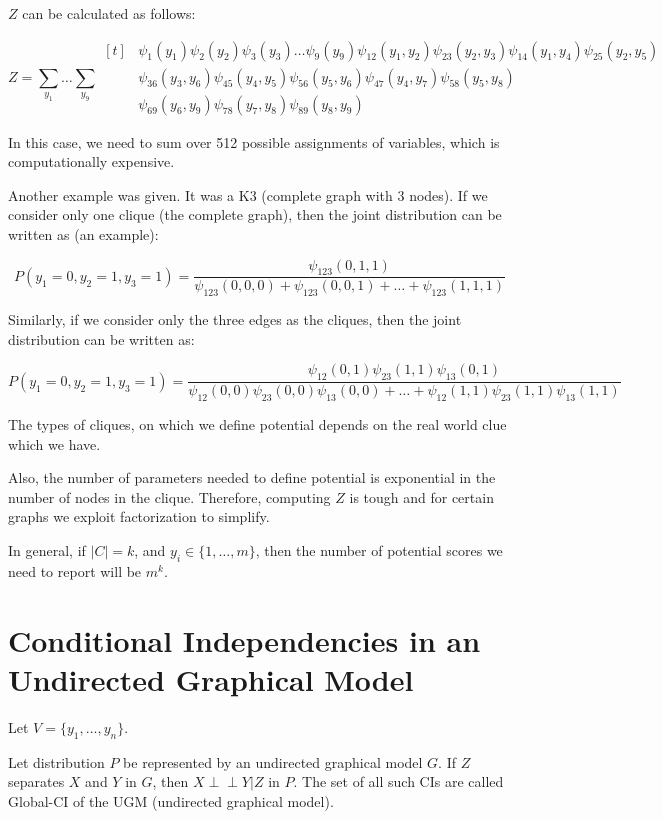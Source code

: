 \documentclass[a4paper]{article}
\begin{document}
$Z$ can be calculated as follows:

\[
Z = \sum_{y_1} \dots \sum_{y_9} \begin{aligned}[t]
& \psi_1(y_1) \psi_2(y_2) \psi_3(y_3) \dots \psi_9(y_9) \psi_{12}(y_1, y_2) \psi_{23}(y_2, y_3) \psi_{14}(y_1, y_4) \psi_{25}(y_2, y_5) \\
& \psi_{36}(y_3, y_6) \psi_{45}(y_4, y_5) \psi_{56}(y_5, y_6) \psi_{47}(y_4, y_7) \psi_{58}(y_5, y_8) \\
& \psi_{69}(y_6, y_9) \psi_{78}(y_7, y_8) \psi_{89}(y_8, y_9) 
\end{aligned}
\]

In this case, we need to sum over 512 possible assignments of variables, which is computationally expensive.


Another example was given. It was a K3 (complete graph with 3 nodes). If we consider only one clique (the complete graph), then the joint distribution can be written as (an example):

\[
    P(y_1 = 0, y_2 = 1, y_3 = 1) = \frac{\psi_{123}(0, 1, 1)}{\psi_{123}(0, 0, 0) + \psi_{123}(0, 0, 1) + \dots + \psi_{123}(1, 1, 1)}
\]

Similarly, if we consider only the three edges as the cliques, then the joint distribution can be written as:

\[
    P(y_1 = 0, y_2 = 1, y_3 = 1) = \frac{\psi_{12}(0, 1) \psi_{23}(1, 1) \psi_{13}(0, 1)}{\psi_{12}(0, 0) \psi_{23}(0, 0) \psi_{13}(0, 0) + \dots + \psi_{12}(1, 1) \psi_{23}(1, 1) \psi_{13}(1, 1)}
\]

The types of cliques, on which we define potential depends on the real world clue which we have. 


Also, the number of parameters needed to define potential is exponential in the number of nodes in the clique. Therefore, computing $Z$ is tough and for certain graphs we exploit factorization to simplify.

In general, if $|C| = k$, and $y_i \in \{1, \dots, m\}$, then the number of potential scores we need to report will be $m^k$.


\section{Conditional Independencies in an Undirected Graphical Model}
Let $V = \{y_1, \dots, y_n\}$.

Let distribution $P$ be represented by an undirected graphical model $G$. If $Z$ separates $X$ and $Y$ in $G$, then $X \perp\!\!\!\perp Y | Z$ in $P$. The set of all such CIs are called Global-CI of the UGM (undirected graphical model).
\end{document}

